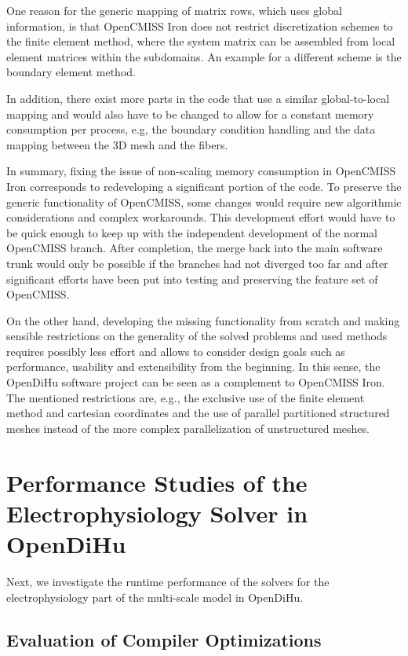 One reason for the generic mapping of matrix rows, which uses global information, is that OpenCMISS Iron does not restrict discretization schemes to the finite element method, where the system matrix can be assembled from local element matrices within the subdomains. An example for a different scheme is the boundary element method.

In addition, there exist more parts in the code that use a similar global-to-local mapping and would also have to be changed to allow for a constant memory consumption per process, e.g, the boundary condition handling and the data mapping between the 3D mesh and the fibers.

In summary, fixing the issue of non-scaling memory consumption in OpenCMISS Iron corresponds to redeveloping a significant portion of the code. 
To preserve the generic functionality of OpenCMISS, some changes would require new algorithmic considerations and complex workarounds.
This development effort would have to be quick enough to keep up with the independent development of the normal OpenCMISS branch. After completion, the merge back into the main software trunk would only be possible if the branches had not diverged too far and after significant efforts have been put into testing and preserving the feature set of OpenCMISS.

On the other hand, developing the missing functionality from scratch and making sensible restrictions on the generality of the solved problems and used methods requires possibly less effort and allows to consider design goals such as performance, usability and extensibility from the beginning.
In this sense, the OpenDiHu software project can be seen as a complement to OpenCMISS Iron.  %
The mentioned restrictions are, e.g., the exclusive use of the finite element method and cartesian coordinates and the use of parallel partitioned structured meshes instead of the more complex parallelization of unstructured meshes.




\section{Performance Studies of the Electrophysiology Solver in OpenDiHu}
Next, we investigate the runtime performance of the solvers for the electrophysiology part of the multi-scale model in OpenDiHu.

\subsection{Evaluation of Compiler Optimizations}

